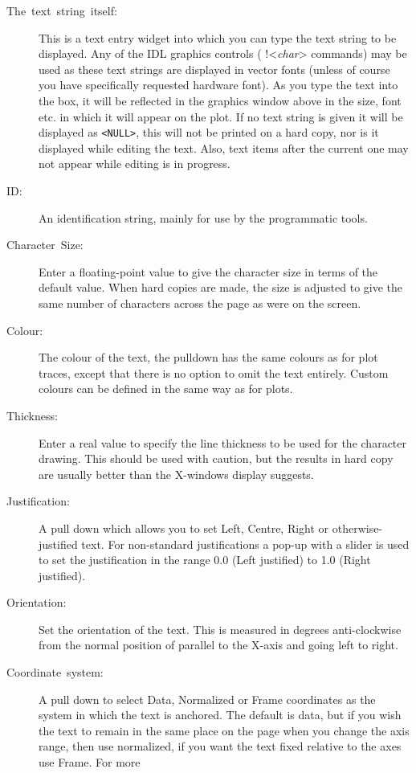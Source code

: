 \documentclass[11pt,twoside,english]{article}
\begin{document}
\begin{description}
\item [The~text~string~itself:]This is a text entry widget into which
  you can type the text string to be displayed. Any of the IDL graphics
  controls ( !<\textit{char}> commands) may be used as these text
  strings are displayed in vector fonts (unless of course you have
  specifically requested hardware font). As you type the text into the
  box, it will be reflected in the graphics window above in the size,
  font etc. in which it will appear on the plot. If no text string is
  given it will be displayed as \texttt{<NULL>}, this will not be
  printed on a hard copy, nor is it displayed while editing the
  text. Also, text items after the current one may not appear while
  editing is in progress.
\item[ID:] An identification string, mainly for use by the
  programmatic tools.
\item [Character~Size:]Enter a floating-point value to give the
  character size in terms of the default value. When hard copies are
  made, the size is adjusted to give the same number of characters
  across the page as were on the screen.
\item [Colour:]The colour of the text, the pulldown has the same
  colours as for plot traces, except that there is no option to omit
  the text entirely. Custom colours can be defined in the same way
  as for plots.
\item [Thickness:]Enter a real value to specify the line thickness
  to be used for the character drawing. This should be used with
  caution, but the results in hard copy are usually better than the
  X-windows display suggests.
\item [Justification:]A pull down which allows you to set Left, Centre,
  Right or otherwise-justified text. For non-standard justifications a
  pop-up with a slider is used to set the justification in the range
  0.0 (Left justified) to 1.0 (Right justified).
\item [Orientation:]Set the orientation of the text. This is measured
  in degrees anti-clockwise from the normal position of parallel to the
  X-axis and going left to right.
\item [Coordinate~system:]A pull down to select Data, Normalized or
  Frame coordinates as the system in which the text is anchored. The
  default is data, but if you wish the text to remain in the same place
  on the page when you change the axis range, then use normalized, if
  you want the text fixed relative to the axes use Frame. For more

\end{description}
\end{document}
